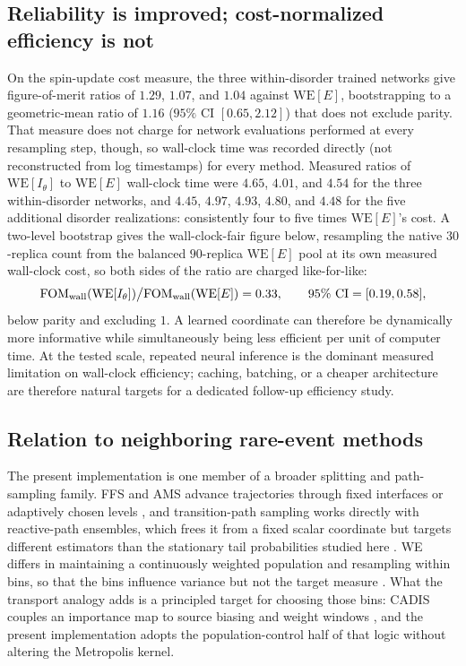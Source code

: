 \documentclass[a4paper,fleqn]{cas-sc}
\newcommand{\WE}{\mathrm{WE}}
\newcommand{\FOM}{\mathrm{FOM}}
\begin{document}
\subsection{Reliability is improved; cost-normalized efficiency is not}\label{sec:costdisc}
On the spin-update cost measure, the three within-disorder trained networks give
figure-of-merit ratios of $1.29$, $1.07$, and $1.04$ against $\WE[E]$, bootstrapping to a
geometric-mean ratio of $1.16$ ($95\%$ CI $[0.65,2.12]$) that does not exclude parity. That
measure does not charge for network evaluations performed at every resampling step, though, so
wall-clock time was recorded directly (not reconstructed from log timestamps) for every
method. Measured ratios of $\WE[I_\theta]$ to $\WE[E]$ wall-clock time were $4.65$, $4.01$, and
$4.54$ for the three within-disorder networks, and $4.45$, $4.97$, $4.93$, $4.80$, and $4.48$
for the five additional disorder realizations: consistently four to five times $\WE[E]$'s
cost. A two-level bootstrap
gives the wall-clock-fair figure below, resampling the native $30$-replica count from the
balanced $90$-replica $\WE[E]$ pool at its own measured wall-clock cost, so both sides of the
ratio are charged like-for-like:
\begin{equation}
\FOM_{\rm wall}(\WE[I_\theta])\big/\FOM_{\rm wall}(\WE[E]) = 0.33,
\qquad 95\%\ \mathrm{CI}=[0.19,0.58],
\label{eq:fomwall}
\end{equation}
below parity and excluding $1$. A learned coordinate can therefore be dynamically more
informative while simultaneously being less efficient per unit of computer time. At the tested
scale, repeated neural inference is the dominant measured limitation on wall-clock efficiency;
caching, batching, or a cheaper architecture are therefore natural targets for a dedicated
follow-up efficiency study.

\subsection{Relation to neighboring rare-event methods}\label{sec:relation}
The present implementation is one member of a broader splitting and path-sampling family.
FFS and AMS advance trajectories through fixed interfaces or adaptively chosen levels
\citep{allen2009,valeriani2007,cerou2007}, and transition-path sampling works directly with
reactive-path ensembles, which frees it from a fixed scalar coordinate but targets different
estimators than the stationary tail probabilities studied here
\citep{chandler1978,dellago1998,bolhuis2002}. WE differs in maintaining a continuously weighted
population and resampling within bins, so that the bins influence variance but not the target
measure \citep{huber1996,zhang2010,zuckerman2017}. What the transport analogy adds is a
principled target for choosing those bins: CADIS couples an importance map to source biasing
and weight windows \citep{wagner1998,haghighat2003,wagnerfw2014}, and the present
implementation adopts the population-control half of that logic without altering the
Metropolis kernel.
\end{document}
